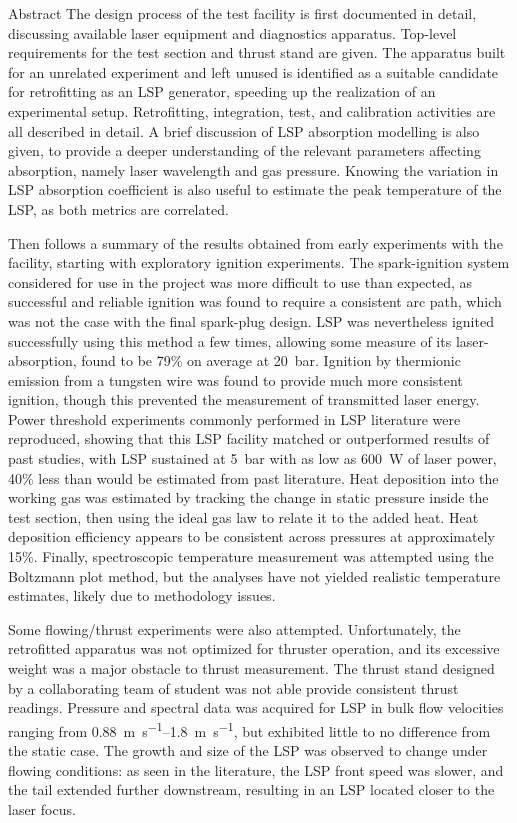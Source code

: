 \begin{plainchp}{Abstract}
    The design process of the test facility is first documented in detail, discussing available laser equipment and diagnostics apparatus. Top-level requirements for the test section and thrust stand are given. The apparatus built for an unrelated experiment and left unused is identified as a suitable candidate for retrofitting as an LSP generator, speeding up the realization of an experimental setup. Retrofitting, integration, test, and calibration activities are all described in detail. A brief discussion of LSP absorption modelling is also given, to provide a deeper understanding of the relevant parameters affecting absorption, namely laser wavelength and gas pressure. Knowing the variation in LSP absorption coefficient is also useful to estimate the peak temperature of the LSP, as both metrics are correlated.

    Then follows a summary of the results obtained from early experiments with the facility, starting with exploratory ignition experiments. The spark-ignition system considered for use in the project was more difficult to use than expected, as successful and reliable ignition was found to require a consistent arc path, which was not the case with the final spark-plug design. LSP was nevertheless ignited successfully using this method a few times, allowing some measure of its laser-absorption, found to be 79\% on average at \qty{20}{bar}. Ignition by thermionic emission from a tungsten wire was found to provide much more consistent ignition, though this prevented the measurement of transmitted laser energy. Power threshold experiments commonly performed in LSP literature were reproduced, showing that this LSP facility matched or outperformed results of past studies, with LSP sustained at \qty{5}{bar} with as low as \qty{600}{W} of laser power, 40\% less than would be estimated from past literature. Heat deposition into the working gas was estimated by tracking the change in static pressure inside the test section, then using the ideal gas law to relate it to the added heat. Heat deposition efficiency appears to be consistent across pressures at approximately 15\%. Finally, spectroscopic temperature measurement was attempted using the Boltzmann plot method, but the analyses have not yielded realistic temperature estimates, likely due to methodology issues.

    Some flowing/thrust experiments were also attempted. Unfortunately, the retrofitted apparatus was not optimized for thruster operation, and its excessive weight was a major obstacle to thrust measurement. The thrust stand designed by a collaborating team of student was not able provide consistent thrust readings. Pressure and spectral data was acquired for LSP in bulk flow velocities ranging from \qtyrange{0.88}{1.8}{m.s^{-1}}, but exhibited little to no difference from the static case. The growth and size of the LSP was observed to change under flowing conditions: as seen in the literature, the LSP front speed was slower, and the tail extended further downstream, resulting in an LSP located closer to the laser focus.


\end{plainchp}
